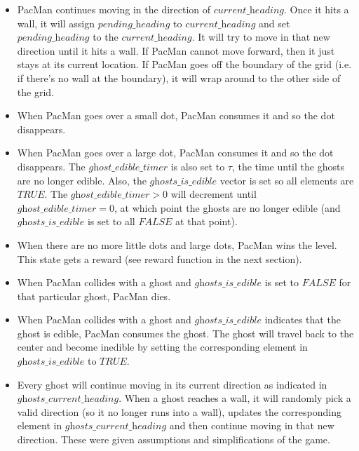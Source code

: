 \documentclass[paper=a4, fontsize=11pt]{scrartcl}
\begin{document}
\begin{itemize}
\item PacMan continues moving in the direction of $\textit{current\_heading}$. Once it hits a wall, it will assign $\textit{pending\_heading}$ to $\textit{current\_heading}$ and set $\textit{pending\_heading}$ to the $\textit{current\_heading}$. It will try to move in that new direction until it hits a wall. If PacMan cannot move forward, then it just stays at its current location. If PacMan goes off the boundary of the grid (i.e. if there's no wall at the boundary), it will wrap around to the other side of the grid.

\item When PacMan goes over a small dot, PacMan consumes it and so the dot disappears.

\item When PacMan goes over a large dot, PacMan consumes it and so the dot disappears. The $\textit{ghost\_edible\_timer}$ is also set to $\tau$, the time until the ghosts are no longer edible. Also, the $\textit{ghosts\_is\_edible}$ vector is set so all elements are $TRUE$. The $\textit{ghost\_edible\_timer} > 0$ will decrement until $\textit{ghost\_edible\_timer} = 0$, at which point the ghosts are no longer edible (and $\textit{ghosts\_is\_edible}$ is set to all $FALSE$ at that point).

\item When there are no more little dots and large dots, PacMan wins the level. This state gets a reward (see reward function in the next section).

\item When PacMan collides with a ghost and $\textit{ghosts\_is\_edible}$ is set to $FALSE$ for that particular ghost, PacMan dies.

\item When PacMan collides with a ghost and $\textit{ghosts\_is\_edible}$ indicates that the ghost is edible, PacMan consumes the ghost. The ghost will travel back to the center and become inedible by setting the corresponding element in $\textit{ghosts\_is\_edible}$ to $TRUE$.

\item Every ghost will continue moving in its current direction as indicated in $\textit{ghosts\_current\_heading}$. When a ghost reaches a wall, it will randomly pick a valid direction (so it no longer runs into a wall), updates the corresponding element in $\textit{ghosts\_current\_heading}$ and then continue moving in that new direction. These were given assumptions and simplifications of the game.
\end{itemize}
\end{document}
